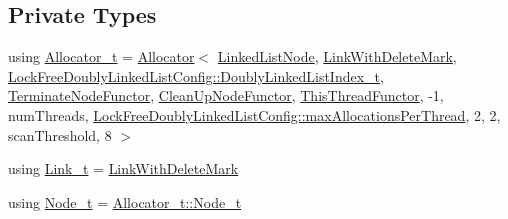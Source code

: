 \subsection*{Private Types}
\begin{DoxyCompactItemize}
\item 
using \mbox{\hyperlink{class_n_u_c_a_r_lock_free_d_s_1_1_lock_free_doubly_linked_list_af534991f4eb0641191f936a80c701e6c}{Allocator\+\_\+t}} = \mbox{\hyperlink{class_n_u_c_a_r_lock_free_d_s_1_1_allocator}{Allocator}}$<$ \mbox{\hyperlink{class_n_u_c_a_r_lock_free_d_s_1_1_lock_free_doubly_linked_list_1_1_linked_list_node}{Linked\+List\+Node}}, \mbox{\hyperlink{class_n_u_c_a_r_lock_free_d_s_1_1_lock_free_doubly_linked_list_1_1_link_with_delete_mark}{Link\+With\+Delete\+Mark}}, \mbox{\hyperlink{namespace_n_u_c_a_r_lock_free_d_s_1_1_lock_free_doubly_linked_list_config_ad084f1e0e5259e450dbbbd2f7cfdb979}{Lock\+Free\+Doubly\+Linked\+List\+Config\+::\+Doubly\+Linked\+List\+Index\+\_\+t}}, \mbox{\hyperlink{class_n_u_c_a_r_lock_free_d_s_1_1_lock_free_doubly_linked_list_1_1_terminate_node_functor}{Terminate\+Node\+Functor}}, \mbox{\hyperlink{class_n_u_c_a_r_lock_free_d_s_1_1_lock_free_doubly_linked_list_1_1_clean_up_node_functor}{Clean\+Up\+Node\+Functor}}, \mbox{\hyperlink{class_n_u_c_a_r_lock_free_d_s_1_1_lock_free_doubly_linked_list_1_1_this_thread_functor}{This\+Thread\+Functor}}, -\/1, num\+Threads, \mbox{\hyperlink{namespace_n_u_c_a_r_lock_free_d_s_1_1_lock_free_doubly_linked_list_config_a0dfa8a093d372cc44eb9a2eba65c5ab6}{Lock\+Free\+Doubly\+Linked\+List\+Config\+::max\+Allocations\+Per\+Thread}}, 2, 2, scan\+Threshold, 8 $>$
\item 
using \mbox{\hyperlink{class_n_u_c_a_r_lock_free_d_s_1_1_lock_free_doubly_linked_list_a08f21d5e04bc2a02d6c1d8861a6ba0de}{Link\+\_\+t}} = \mbox{\hyperlink{class_n_u_c_a_r_lock_free_d_s_1_1_lock_free_doubly_linked_list_1_1_link_with_delete_mark}{Link\+With\+Delete\+Mark}}
\item 
using \mbox{\hyperlink{class_n_u_c_a_r_lock_free_d_s_1_1_lock_free_doubly_linked_list_abb8fd1da564d74028552e980bc99a704}{Node\+\_\+t}} = \mbox{\hyperlink{class_n_u_c_a_r_lock_free_d_s_1_1_allocator_ac44b7846713e20e26a7eede2492fda47}{Allocator\+\_\+t\+::\+Node\+\_\+t}}
\end{DoxyCompactItemize}
